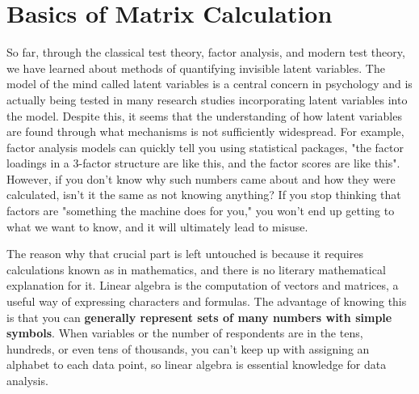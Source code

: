 \documentclass{ltjsbook}
\begin{document}
\chapter{Basics of Matrix Calculation}
\label{x06_matrix}
So far, through the classical test theory, factor analysis, and modern test theory, we have learned about methods of quantifying invisible latent variables.
The model of the mind called latent variables is a central concern in psychology and is actually being tested in many research studies incorporating latent variables into the model.
Despite this, it seems that the understanding of how latent variables are found through what mechanisms is not sufficiently widespread. For example, factor analysis models can quickly tell you using statistical packages, "the factor loadings in a 3-factor structure are like this, and the factor scores are like this". However, if you don't know why such numbers came about and how they were calculated, isn't it the same as not knowing anything? If you stop thinking that factors are "something the machine does for you," you won't end up getting to what we want to know, and it will ultimately lead to misuse.

The reason why that crucial part is left untouched is because it requires calculations known as  in mathematics, and there is no literary mathematical explanation for it. Linear algebra is the computation of vectors and matrices, a useful way of expressing characters and formulas. The advantage of knowing this is that you can \textbf{generally represent sets of many numbers with simple symbols}. When variables or the number of respondents are in the tens, hundreds, or even tens of thousands, you can't keep up with assigning an alphabet to each data point, so linear algebra is essential knowledge for data analysis.
\end{document}

